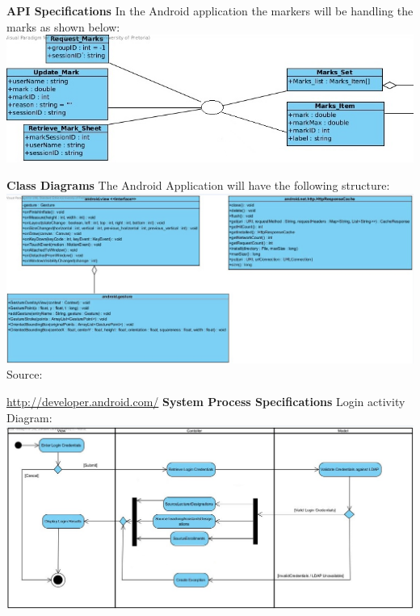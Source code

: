 \documentclass{article}
\begin{document}
\noindent \textbf{API Specifications}
In the Android application the markers will be handling the marks as shown below:
\noindent \textbf{\includegraphics[scale=0.4]{marks.jpg}}

\noindent \textbf{Class Diagrams}
The Android Application will have the following structure: 
\noindent \textbf{\includegraphics[scale=0.4]{androidClass.jpg}}
Source:
\usepackage{hyperref}
\url{http://developer.android.com/}
\noindent \textbf{System Process Specifications}
Login activity Diagram:
\noindent \textbf{\includegraphics[scale=0.4]{androidLogin.jpg}}
\noindent \textbf{}

\noindent \textbf{}

\noindent \textbf{}

\noindent \textbf{}

\noindent \textbf{}

\noindent \textbf{}

\noindent \textbf{}

\noindent \textbf{}
\end{document}
